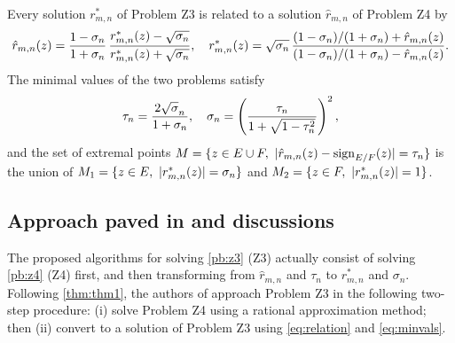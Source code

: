 \begin{theorem}
\label{thm:thm1}
Every solution $r_{m,n}^*$ of Problem Z3 is related to a solution 
$\hat r_{m,n}$ of Problem Z4 by
\vspace{-2mm}
\begin{equation}
\hat r_{m,n} (z) = {1-\sigma_n\over 1+\sigma_n} \,{r_{m,n}^*(z) - \sqrt{\sigma_n}
\over r_{m,n}^*(z) + \sqrt{\sigma_n}}, \quad
r_{m,n}^*(z) = \sqrt{\sigma_n} \,
{(1-\sigma_n)/(1+\sigma_n) + \hat r_{m,n}(z) \over
(1-\sigma_n)/(1+\sigma_n) - \hat r_{m,n}(z)}.
\label{eq:relation}
\end{equation}
The minimal values of the two problems satisfy
\vspace{-2mm}
\begin{equation}
\tau_n = {2\sqrt\sigma_n\over 1 + \sigma_n}, \quad
\sigma_n = \left({\tau_n\over 1 + \sqrt{1-\tau_n^2}\kern .7pt} \right)^2,
\label{eq:minvals}
\end{equation}
and the set of extremal points $M = \{z\in E\cup F, ~|\hat r_{m,n}(z) - \mathrm{sign}_{E/F}(z)| = \tau_n\}$ is the union of  $M_1 = \{z\in E, ~|r_{m,n}^*(z)| = \sigma_n\}$ and $M_2 = \{z\in F, ~|r_{m,n}^*(z)| = 1\}$.
\end{theorem}


\subsection{Approach paved in  \cite{trefethen2024computation} and discussions}

The proposed algorithms for solving \cref{pb:z3} (Z3) actually consist of solving \cref{pb:z4} (Z4) first, and then transforming from $\hat r_{m,n}$ and $\tau_n$ to $r_{m,n}^*$ and $\sigma_n$. Following \cref{thm:thm1}, the authors of \cite{trefethen2024computation} approach Problem Z3 in the following two-step procedure: (i) solve Problem Z4 using a rational approximation method; then (ii) convert to a solution of Problem Z3 using \cref{eq:relation} and \cref{eq:minvals}.

